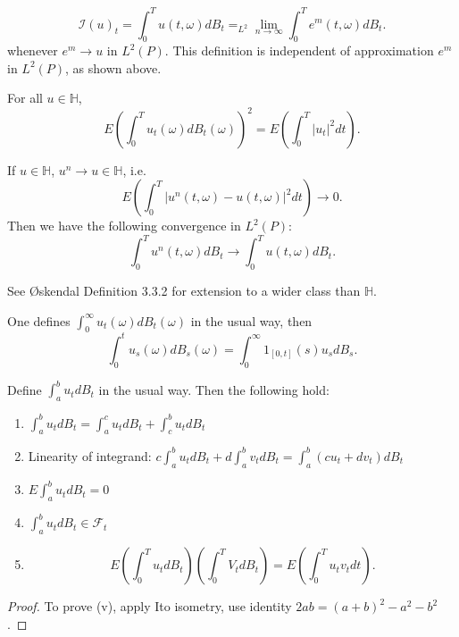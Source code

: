 \begin{definition}
	\[
		\mathcal{I}(u)_t = \int _0^T u(t, \omega) d B_t
		=_{L^2} \lim_{n \to \infty} \int _0^T e^m(t, \omega) d B_t
	.\] 
	whenever $e^m \to  u$ in $L^2(P)$.
		This definition is independent of approximation $e^m$ in $L^2(P)$, as shown above.
\end{definition}
\begin{corollary}
	For all $u \in \mathbb{H}$,
	\[
		E\left( \int _0^T u_t(\omega) d B_t(\omega) \right) ^2
	= E\left( \int _0^T |u_t|^2 d t \right) 
	.\] 
\end{corollary}

\begin{corollary}
	If $u \in \mathbb{H}$, $u^n \to  u \in \mathbb{H}$, i.e.
	\[
		E \left( \int _0^T \left| u^n(t, \omega) - u(t, \omega) \right| ^2 d t \right)  \to  0
	.\] 
	Then we have the following convergence in $L^2(P)$:
	 \[
		\int _0^T u^n(t, \omega) dB_t \to \int _0^T u(t, \omega) d B_t
	.\] 
\end{corollary}

\begin{remark}
	See Øskendal Definition 3.3.2 for extension to a wider class than $\mathbb{H}$.
\end{remark}

\begin{remark}
	One defines $\int _0^\infty  u_t(\omega) d B_t (\omega)$ in the usual way, then
	\[
		\int _0^t u_s(\omega) dB_s(\omega)
		= \int _0^\infty 1_{[0, t]}(s) u_s d B_s
	.\] 
\end{remark}

Define $\int _a^b u_t dB_t$ in the usual way. Then the following hold:
\begin{proposition}
	\begin{enumerate}
		\item $\int _a^b u_t d B_t = \int _a^c u_t d B_t+ \int _c^bu_t d B_t$
		\item Linearity of integrand: $c \int _a^b u_t d B_t + d \int _a^b v_t d B_t = \int _a^b (cu_t + dv_t) d B_t$
		\item $E \int _a^b u_t d B_t = 0$
		\item $\int _a^b u_t d B_t \in \mathcal{F}_t$
		\item \[
			E\left( \int _0^T u_t dB_t \right) \left( \int _0^T V_t dB_t \right) 
			= E\left( \int _0^T u_t v_t dt \right) 
		.\] 
	\end{enumerate}
\end{proposition}
\begin{proof}
	To prove (v), apply Ito isometry, use identity  $2 ab = (a + b)^2 - a^2 - b^2$.
\end{proof}

